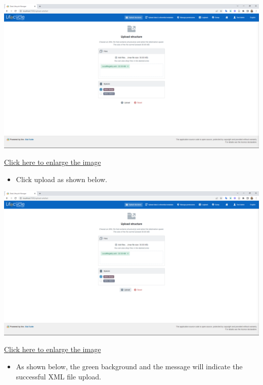 \documentclass[
]{book}
\providecommand{\tightlist}{%
  \setlength{\itemsep}{0pt}\setlength{\parskip}{0pt}}
\begin{document}
\begin{center}\includegraphics[width=1\linewidth]{./images/image198} \end{center}

\href{images/image198.png}{Click here to enlarge the image}

\begin{itemize}
\tightlist
\item
  Click upload as shown below.
\end{itemize}

\begin{center}\includegraphics[width=1\linewidth]{./images/image200} \end{center}

\href{images/image200.png}{Click here to enlarge the image}

\begin{itemize}
\tightlist
\item
  As shown below, the green background and the message will indicate the successful XML file upload.
\end{itemize}
\end{document}
